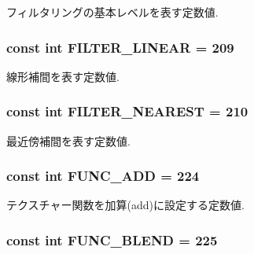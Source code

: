 フィルタリングの基本レベルを表す定数値. \hypertarget{classm3g_1_1Texture2D_5f06003f50141919a3665d22f55602a8}{
\subsubsection[{FILTER\_\-LINEAR}]{\setlength{\rightskip}{0pt plus 5cm}const int {\bf FILTER\_\-LINEAR} = 209}}
\label{classm3g_1_1Texture2D_5f06003f50141919a3665d22f55602a8}


線形補間を表す定数値. \hypertarget{classm3g_1_1Texture2D_1ee2e06d6462fdafd5f17e63eddfb8fe}{
\subsubsection[{FILTER\_\-NEAREST}]{\setlength{\rightskip}{0pt plus 5cm}const int {\bf FILTER\_\-NEAREST} = 210}}
\label{classm3g_1_1Texture2D_1ee2e06d6462fdafd5f17e63eddfb8fe}


最近傍補間を表す定数値. \hypertarget{classm3g_1_1Texture2D_825ea3aff59f79958257ac557c802760}{
\subsubsection[{FUNC\_\-ADD}]{\setlength{\rightskip}{0pt plus 5cm}const int {\bf FUNC\_\-ADD} = 224}}
\label{classm3g_1_1Texture2D_825ea3aff59f79958257ac557c802760}


テクスチャー関数を加算(add)に設定する定数値. \hypertarget{classm3g_1_1Texture2D_57e3e01014bbfd62b8665586fdd2ecb3}{
\subsubsection[{FUNC\_\-BLEND}]{\setlength{\rightskip}{0pt plus 5cm}const int {\bf FUNC\_\-BLEND} = 225}}
\label{classm3g_1_1Texture2D_57e3e01014bbfd62b8665586fdd2ecb3}


